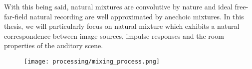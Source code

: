 With this being said, natural mixtures are convolutive by nature and ideal free-far-field natural recording are well approximated by anechoic mixtures.
In this thesis, we will particularly focus on natural mixture which exhibits a natural correspondence between image sources, impulse responses and the
room properties of the auditory scene.


\begin{figure}[t]
    \begin{fullwidthfig}
        \texttt{[image: processing/mixing\_process.png]}
    \end{fullwidthfig}

    \vspace{-\baselineskip}\vspace{-\baselineskip}
    \label{fig:processing:mixing}
\end{figure}


